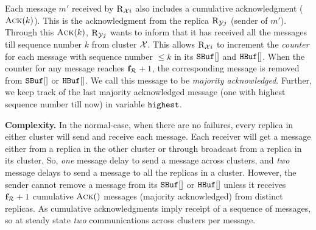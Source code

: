 \begin{itemize}[wide]
Each message $m'$ received by $\textsc{R}_{{\mathcal{X}}{i}}$ also includes a cumulative acknowledgment ($\textsc{Ack}(k)$). 
This is the acknowledgment from the replica $\textsc{R}_{{\mathcal{Y}}{j}}$ (sender of $m'$).
Through this $\textsc{Ack}(k)$, $\textsc{R}_{{\mathcal{Y}}{j}}$ wants to inform that it has received all the messages till sequence number $k$ 
from cluster $\mathcal{X}$.
This allows $\textsc{R}_{{\mathcal{X}}{i}}$ to increment the {\em counter} for each message with sequence number $\le k$ 
in its $\texttt{SBuf}[{}]$ and $\texttt{HBuf}[{}]$.
When the counter for any message reaches $\textbf{f}_{\mathcal{R}_{\mathcal{}}}+1$, the corresponding message is removed from $\texttt{SBuf}[{}]$ or $\texttt{HBuf}[{}]$.
We call this message to be {\em majority acknowledged}.
Further, we keep track of the last majority acknowledged message (one with highest sequence number till now) in variable $\texttt{highest}{}$.

\end{itemize}


{\bf Complexity.}
In the normal-case, when there are no failures, every replica in either cluster will send and receive each message.
Each receiver will get a message either from a replica in the other cluster or through broadcast from a replica in its cluster. 
So, {\em one} message delay to send a message across clusters, and {\em two} message delays to send a message to all the replicas in a cluster.
However, the sender cannot remove a message from its $\texttt{SBuf}[{}]$ or $\texttt{HBuf}[{}]$ unless it receives $\textbf{f}_{\mathcal{R}_{\mathcal{}}}+1$ cumulative $\textsc{Ack}()$ messages (majority acknowledged) 
from distinct replicas.
As cumulative acknowledgments imply  receipt of a sequence of messages, so at steady state {\em two} communications across clusters 
per message.






